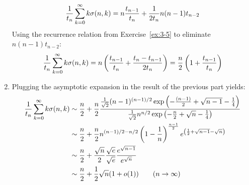 \begin{solution}
\begin{enumerate}[label=(\alph*)]
        \[
            \frac{1}{t_n}\bsum[k] k\sigma(n,k) = n\frac{t_{n-1}}{t_n} + \frac{1}{2t_n}n(n-1)t_{n-2}
        \]
        Using the recurrence relation from Exercise~\ref{ex:3-5} to eliminate $n(n-1)t_{n-2}$:
        \[
            \frac{1}{t_n}\bsum[k] k\sigma(n,k) = n\left(\frac{t_{n-1}}{t_n} + \frac{t_n - t_{n-1}}{2t_n}\right) = \frac{n}{2}\left(1+\frac{t_{n-1}}{t_n} \right)
        \]
        \item Plugging the asymptotic expansion in the result of the previous part yields:
        \begin{align*}
            \frac{1}{t_n}\bsum[k] k\sigma(n,k) &\sim \frac{n}{2} + \frac{n}{2}\frac{\frac{1}{\sqrt{2}} (n-1)^{(n-1)/2}\exp\left(-\frac{(n-1)}{2} + \sqrt{n-1} - \frac{1}{4}\right)}{\frac{1}{\sqrt{2}} n^{n/2} \exp\left(-\frac{n}{2}+\sqrt{n} - \frac{1}{4}\right)} \\
            &\sim  \frac{n}{2} + \frac{n}{2}n^{(n-1)/2 - n/2} \left(1-\frac{1}{n}\right)^{\frac{n-1}{2}} e^{\left(\frac{1}{2} + \sqrt{n-1} - \sqrt{n} \right)} \\
            &\sim  \frac{n}{2} + \frac{\sqrt{n}}{2}  \frac{\sqrt{e}}{\sqrt{e}} \frac{e^{\sqrt{n-1}}}{e^{\sqrt{n}}} \\
            &\sim  \frac{n}{2} + \frac{1}{2} \sqrt{n}(1+o(1)) \qquad (n\to \infty)
        \end{align*}
    \end{enumerate}
\end{solution}